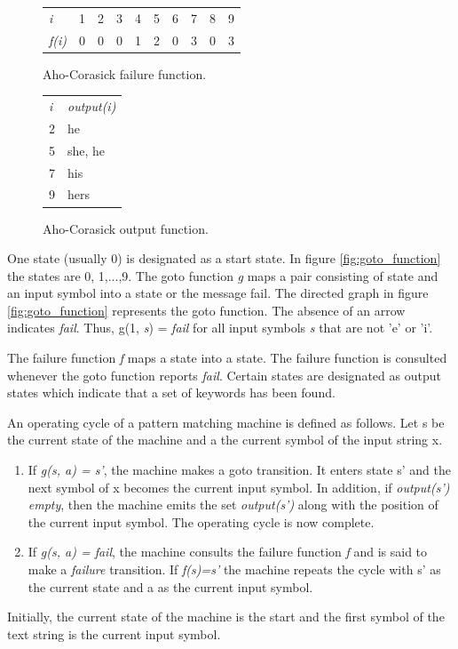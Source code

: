 \documentclass[thesis=M,english]{FITthesis}[2011/07/15]
\begin{document}
\begin{figure}[h]
\centering
\begin{tabular}{l l l l l l l l l l}
\emph{i}       & 1 & 2 & 3 & 4 & 5 & 6 & 7 & 8 & 9 \\
\emph{f(i)}    & 0 & 0 & 0 & 1 & 2 & 0 & 3 & 0 & 3 \\
\end{tabular}
\caption{Aho-Corasick failure function.}
\label{fig:failure_function}
\end{figure}

\begin{figure}[h]
\centering
\begin{tabular}{l l}
\emph{i} & \emph{output(i)} \\
2 & {he} \\
5 & {she, he} \\
7 & {his} \\
9 & {hers} \\
\end{tabular}
\caption{Aho-Corasick output function.}
\label{fig:output_function}
\end{figure}

One state (usually 0) is designated as a start state. In figure \ref{fig:goto_function} the states are 0, 1,...,9. The goto function \emph{g} maps a pair consisting of state and an input symbol into a state or the message fail. The directed graph in figure \ref{fig:goto_function} represents the goto function. The absence of an arrow indicates \emph{fail}. Thus, g(1, \emph{s}) = \emph{fail} for all input symbols \emph{s} that are not 'e' or 'i'.

The failure function \emph{f} maps a state into a state. The failure function is consulted whenever the goto function reports \emph{fail}. Certain states are designated as output states which indicate that a set of keywords has been found.

An operating cycle of a pattern matching machine is defined as follows. Let s be the current state of the machine and a the current symbol of the input string x.
\begin{enumerate}
\item If \emph{g(s, a) = s'}, the machine makes a goto transition. It enters state s' and the next symbol of x becomes the current input symbol.
In addition, if  \emph{output(s')  empty}, then the machine emits the set \emph{output(s')} along with the position of the current input symbol. The operating cycle is now complete.
\item If \emph{g(s, a) = fail}, the machine consults the failure function \emph{f} and is said to make a \emph{failure} transition. If \emph{f(s)=s'} the machine repeats the cycle with s' as the current state and a as the current input symbol.
\end{enumerate}
Initially, the current state of the machine is the start and the first symbol of the text string is the current input symbol. 
\end{document}
